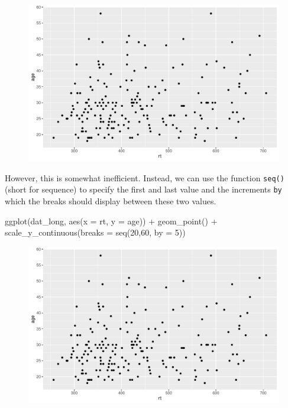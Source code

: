 \documentclass[
  english,
  doc,floatsintext]{apa6}
\newenvironment{Shaded}{\begin{snugshade}}{\end{snugshade}}
\newcommand{\AttributeTok}[1]{\textcolor[rgb]{0.77,0.63,0.00}{#1}}
\newcommand{\DecValTok}[1]{\textcolor[rgb]{0.00,0.00,0.81}{#1}}
\newcommand{\FunctionTok}[1]{\textcolor[rgb]{0.00,0.00,0.00}{#1}}
\newcommand{\NormalTok}[1]{#1}
\newcommand{\SpecialCharTok}[1]{\textcolor[rgb]{0.00,0.00,0.00}{#1}}
\begin{document}
\begin{figure}

{\centering \includegraphics[width=1\linewidth]{images/breaks1-1} 

}

\caption{ }\label{fig:breaks1}
\end{figure}

However, this is somewhat inefficient. Instead, we can use the function \texttt{seq()} (short for sequence) to specify the first and last value and the increments \texttt{by} which the breaks should display between these two values.

\begin{Shaded}
\begin{Highlighting}[]
\FunctionTok{ggplot}\NormalTok{(dat\_long, }\FunctionTok{aes}\NormalTok{(}\AttributeTok{x =}\NormalTok{ rt, }\AttributeTok{y =}\NormalTok{ age)) }\SpecialCharTok{+}
  \FunctionTok{geom\_point}\NormalTok{() }\SpecialCharTok{+}
  \FunctionTok{scale\_y\_continuous}\NormalTok{(}\AttributeTok{breaks =} \FunctionTok{seq}\NormalTok{(}\DecValTok{20}\NormalTok{,}\DecValTok{60}\NormalTok{, }\AttributeTok{by =} \DecValTok{5}\NormalTok{))}
\end{Highlighting}
\end{Shaded}

\begin{figure}

{\centering \includegraphics[width=1\linewidth]{images/breaks2-1} 

}

\caption{ }\label{fig:breaks2}
\end{figure}
\end{document}
